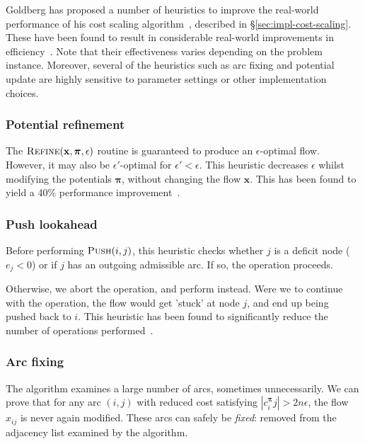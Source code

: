 Goldberg has proposed a number of heuristics to improve the real-world performance of his cost scaling algorithm~\cite{Goldberg:1997}, described in \S\ref{sec:impl-cost-scaling}. These have been found to result in considerable real-world improvements in efficiency~\cite{Bunnagel:1998,KiralyKovacs:2012}. Note that their effectiveness varies depending on the problem instance. Moreover, several of the heuristics such as arc fixing and potential update are highly sensitive to parameter settings or other implementation choices.

\subsubsection{Potential refinement} 
The $\textproc{Refine}(\mathbf{x},\boldsymbol{\pi},\epsilon)$ routine is guaranteed to produce an $\epsilon$-optimal flow. However, it may also be $\epsilon'$-optimal for $\epsilon' < \epsilon$. This heuristic decreases $\epsilon$ whilst modifying the potentials $\boldsymbol{\pi}$, without changing the flow $\mathbf{x}$. This has been found to yield a 40\% performance improvement~\cite{Bunnagel:1998}.

\subsubsection{Push lookahead}
Before performing $\textproc{Push}(i,j)$, this heuristic checks whether $j$ is a deficit node ($e_j < 0$) or if $j$ has an outgoing admissible arc. If so, the  operation proceeds.

Otherwise, we abort the  operation, and perform  instead. Were we to continue with the  operation, the flow would get 'stuck' at node $j$, and end up being pushed back to $i$. This heuristic has been found to significantly reduce the number of  operations performed~\cite{Goldberg:1997}.

\subsubsection{Arc fixing}
The algorithm examines a large number of arcs, sometimes unnecessarily. We can prove that for any arc $(i,j)$ with reduced cost satisfying $\left|c^{\boldsymbol{\pi}}_ij\right| > 2n\epsilon$, the flow $x_{ij}$ is never again modified. These arcs can safely be \emph{fixed}: removed from the adjacency list examined by the algorithm. 

